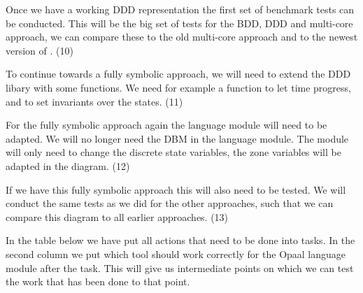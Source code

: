 Once we have a working DDD representation the first set of benchmark tests can be conducted. This will be the big set of tests for the BDD, DDD and multi-core approach, we can compare these to the old multi-core approach and to the newest version of \uppaal{}. (10)

To continue towards a fully symbolic approach, we will need to extend the DDD libary with some functions. We need for example a function to let time progress, and to set invariants over the states. (11)

For the fully symbolic approach again the language module will need to be adapted. We will no longer need the DBM in the language module. The module will only need to change the discrete state variables, the zone variables will be adapted in the diagram. (12)

If we have this fully symbolic approach this will also need to be tested. We will conduct the same tests as we did for the other approaches, such that we can compare this diagram to all earlier approaches. (13)

In the table below we have put all actions that need to be done into tasks. In the second column we put which tool should work correctly for the Opaal language module after the task. This will give us intermediate points on which we can test the work that has been done to that point.

